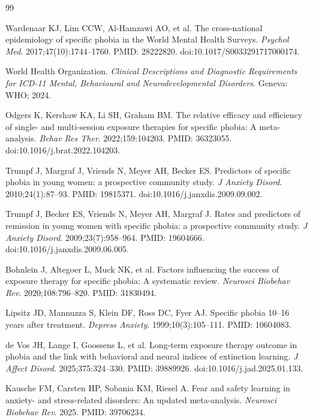 \documentclass[11pt]{article}
\begin{document}
\begin{thebibliography}{99}

Wardenaar KJ, Lim CCW, Al-Hamzawi AO, et al. The cross-national epidemiology of specific phobia in the World Mental Health Surveys. \emph{Psychol Med}. 2017;47(10):1744--1760. PMID: 28222820. doi:10.1017/S0033291717000174.

World Health Organization. \emph{Clinical Descriptions and Diagnostic Requirements for ICD-11 Mental, Behavioural and Neurodevelopmental Disorders}. Geneva: WHO; 2024.

Odgers K, Kershaw KA, Li SH, Graham BM. The relative efficacy and efficiency of single- and multi-session exposure therapies for specific phobia: A meta-analysis. \emph{Behav Res Ther}. 2022;159:104203. PMID: 36323055. doi:10.1016/j.brat.2022.104203.

Trumpf J, Margraf J, Vriends N, Meyer AH, Becker ES. Predictors of specific phobia in young women: a prospective community study. \emph{J Anxiety Disord}. 2010;24(1):87--93. PMID: 19815371. doi:10.1016/j.janxdis.2009.09.002.

Trumpf J, Becker ES, Vriends N, Meyer AH, Margraf J. Rates and predictors of remission in young women with specific phobia: a prospective community study. \emph{J Anxiety Disord}. 2009;23(7):958--964. PMID: 19604666. doi:10.1016/j.janxdis.2009.06.005.

Bohnlein J, Altegoer L, Muck NK, et al. Factors influencing the success of exposure therapy for specific phobia: A systematic review. \emph{Neurosci Biobehav Rev}. 2020;108:796--820. PMID: 31830494.

Lipsitz JD, Mannuzza S, Klein DF, Ross DC, Fyer AJ. Specific phobia 10--16 years after treatment. \emph{Depress Anxiety}. 1999;10(3):105--111. PMID: 10604083.

de Vos JH, Lange I, Goossens L, et al. Long-term exposure therapy outcome in phobia and the link with behavioral and neural indices of extinction learning. \emph{J Affect Disord}. 2025;375:324--330. PMID: 39889926. doi:10.1016/j.jad.2025.01.133.

Kausche FM, Carsten HP, Sobania KM, Riesel A. Fear and safety learning in anxiety- and stress-related disorders: An updated meta-analysis. \emph{Neurosci Biobehav Rev}. 2025. PMID: 39706234.


\end{thebibliography}
\end{document}
